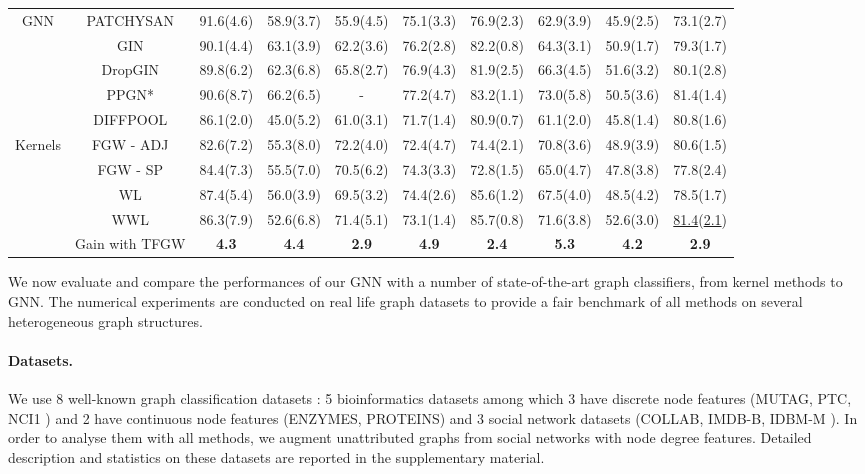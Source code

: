 \documentclass{article}
\begin{document}
\begin{table}[t!]
\begin{center}
{\begin{tabular}{|c|c||c|c|c|c|c||c|c|c|}
				\hline
				GNN & PATCHYSAN & 91.6(4.6) & 58.9(3.7) & 55.9(4.5) & 75.1(3.3) & 76.9(2.3) & 62.9(3.9)& 45.9(2.5)& 73.1(2.7) \\
				& GIN & 90.1(4.4) & 63.1(3.9) & 62.2(3.6)&76.2(2.8) & 82.2(0.8) & 64.3(3.1)& 50.9(1.7)& 79.3(1.7)\\
& DropGIN & 89.8(6.2) & 62.3(6.8) & 65.8(2.7)&76.9(4.3) & 81.9(2.5) & 66.3(4.5) &  51.6(3.2)& 80.1(2.8) \\
				& PPGN* & 90.6(8.7) & 66.2(6.5) & - & 77.2(4.7) & 83.2(1.1) & 73.0(5.8) & 50.5(3.6) & 81.4(1.4)\\
				& DIFFPOOL & 86.1(2.0) & 45.0(5.2) & 61.0(3.1) & 71.7(1.4) & 80.9(0.7) & 61.1(2.0)& 45.8(1.4) &80.8(1.6) \\ \hline
Kernels & FGW - ADJ & 82.6(7.2) & 55.3(8.0)& 72.2(4.0) & 72.4(4.7) & 74.4(2.1)&  70.8(3.6) & 48.9(3.9)& 80.6(1.5) \\
				& FGW - SP & 84.4(7.3) & 55.5(7.0) & 70.5(6.2) & 74.3(3.3) & 72.8(1.5)& 65.0(4.7) & 47.8(3.8)& 77.8(2.4)\\
& WL  & 87.4(5.4) & 56.0(3.9) & 69.5(3.2)& 74.4(2.6) & 85.6(1.2) &67.5(4.0) & 48.5(4.2)& 78.5(1.7)\\
				& WWL & 86.3(7.9) & 52.6(6.8) & 71.4(5.1) & 73.1(1.4) & 85.7(0.8) & 71.6(3.8) & 52.6(3.0)& \underline{81.4}(\underline{2.1})\\
				\hline \hline
				 & Gain with TFGW & \textbf{4.3} & \textbf{4.4} & \textbf{2.9} & \textbf{4.9}& \textbf{2.4}& \textbf{5.3}& \textbf{4.2} & \textbf{2.9}\\ \hline
		\end{tabular}}
	\end{center}
\end{table}

We now evaluate and compare the performances of our  GNN with a
number of state-of-the-art  graph classifiers, from kernel methods to GNN. The
numerical experiments are conducted on real life graph datasets to provide a fair benchmark of all methods on several heterogeneous graph structures. 


\paragraph{Datasets.} We use 8 well-known graph classification datasets \cite{KKMMN2016}: 5
bioinformatics datasets among which 3  have discrete node features (MUTAG,
PTC, NCI1 \cite{kriege2012subgraph,shervashidze2011weisfeiler}) and 2 have continuous node features (ENZYMES, PROTEINS\cite{borgwardt2005protein}) and 3
social network datasets (COLLAB, IMDB-B, IDBM-M \cite{yanardag-deep-2015}). In order to analyse them with all methods, we augment unattributed graphs from social networks with node degree features. Detailed description and statistics on these datasets are reported in the supplementary material. 
\end{document}
